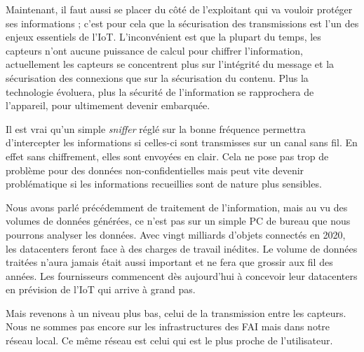 
Maintenant, il faut aussi se placer du côté de l'exploitant qui va vouloir protéger ses informations ; c'est pour cela que la sécurisation des transmissions est l'un des enjeux essentiels de l'IoT. L'inconvénient est que la plupart du temps, les capteurs n'ont aucune puissance de calcul pour chiffrer l'information, actuellement les capteurs se concentrent plus sur l'intégrité du message et la sécurisation des connexions que sur la sécurisation du contenu. Plus la technologie évoluera, plus la sécurité de l'information se rapprochera de l'appareil, pour ultimement devenir embarquée. 

Il est vrai qu'un simple \textit{sniffer} réglé sur la bonne fréquence permettra d’intercepter les informations si celles-ci sont transmisses sur un canal sans fil. En effet sans chiffrement, elles sont envoyées en clair. Cela ne pose pas trop de problème pour des données non-confidentielles mais peut vite devenir problématique si les informations recueillies sont de nature plus sensibles.


Nous avons parlé précédemment de traitement de l'information, mais au vu des volumes de données générées, ce n'est pas sur un simple PC de bureau que nous pourrons analyser les données. Avec vingt milliards d'objets connectés en 2020, les datacenters feront face à des charges de travail inédites. Le volume de données traitées n'aura jamais était aussi important et ne fera que grossir aux fil des années. Les fournisseurs commencent dès aujourd'hui à concevoir leur datacenters en prévision de l'IoT qui arrive à grand pas.

Mais revenons à un niveau plus bas, celui de la transmission entre les capteurs. Nous ne sommes pas encore sur les infrastructures des FAI mais dans notre réseau local. Ce même réseau est celui qui est le plus proche de l'utilisateur. 
